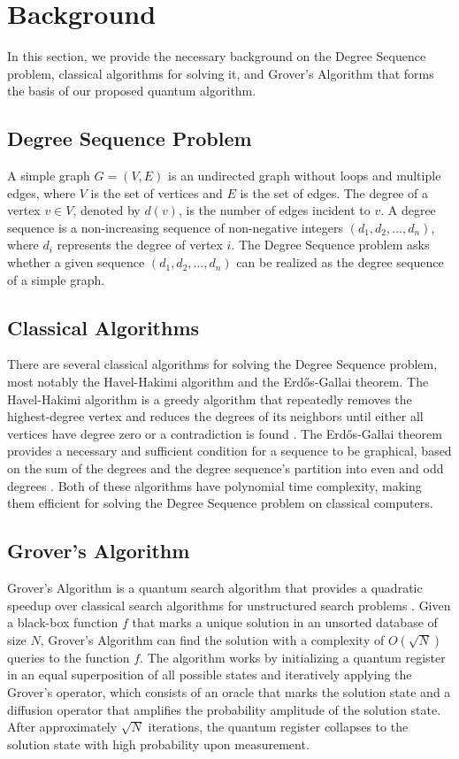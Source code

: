 \section{Background}
\label{sec:background}

In this section, we provide the necessary background on the Degree Sequence problem, classical algorithms for solving it, and Grover's Algorithm that forms the basis of our proposed quantum algorithm.

\subsection{Degree Sequence Problem}

A simple graph $G = (V, E)$ is an undirected graph without loops and multiple edges, where $V$ is the set of vertices and $E$ is the set of edges. The degree of a vertex $v \in V$, denoted by $d(v)$, is the number of edges incident to $v$. A degree sequence is a non-increasing sequence of non-negative integers $(d_1, d_2, \ldots, d_n)$, where $d_i$ represents the degree of vertex $i$. The Degree Sequence problem asks whether a given sequence $(d_1, d_2, \ldots, d_n)$ can be realized as the degree sequence of a simple graph.

\subsection{Classical Algorithms}

There are several classical algorithms for solving the Degree Sequence problem, most notably the Havel-Hakimi algorithm and the Erdős-Gallai theorem. The Havel-Hakimi algorithm is a greedy algorithm that repeatedly removes the highest-degree vertex and reduces the degrees of its neighbors until either all vertices have degree zero or a contradiction is found \cite{havel_hakimi}. The Erdős-Gallai theorem provides a necessary and sufficient condition for a sequence to be graphical, based on the sum of the degrees and the degree sequence's partition into even and odd degrees \cite{erdos_gallai}. Both of these algorithms have polynomial time complexity, making them efficient for solving the Degree Sequence problem on classical computers.

\subsection{Grover's Algorithm}

Grover's Algorithm is a quantum search algorithm that provides a quadratic speedup over classical search algorithms for unstructured search problems \cite{grover}. Given a black-box function $f$ that marks a unique solution in an unsorted database of size $N$, Grover's Algorithm can find the solution with a complexity of $O(\sqrt{N})$ queries to the function $f$. The algorithm works by initializing a quantum register in an equal superposition of all possible states and iteratively applying the Grover's operator, which consists of an oracle that marks the solution state and a diffusion operator that amplifies the probability amplitude of the solution state. After approximately $\sqrt{N}$ iterations, the quantum register collapses to the solution state with high probability upon measurement.

